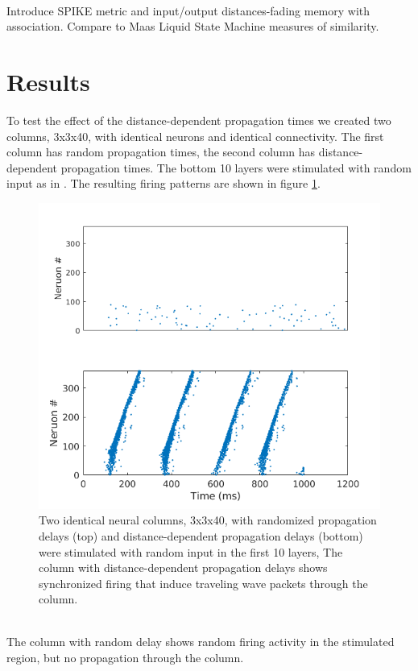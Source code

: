 \documentclass[a4paper,11pt]{article}
\begin{document}
\\
Introduce SPIKE metric and input/output distances-fading memory with association.
Compare to Maas Liquid State Machine measures of similarity.

\section{Results}
To test the effect of the distance-dependent propagation times we created two columns, 3x3x40,  with identical neurons and identical connectivity.
The first column has random propagation times, the second column has distance-dependent propagation times.
The bottom 10 layers were stimulated with random input as in \cite{izhikevich2003}.
The resulting firing patterns are shown in figure \ref{fig:delaycompare}.
\begin{figure}
 \caption{Two identical neural columns, 3x3x40, with randomized propagation delays (top) and distance-dependent propagation delays (bottom) were stimulated with random input in the first 10 layers,
 The column with distance-dependent propagation delays shows synchronized firing that induce traveling wave packets through the column.}
 \label{fig:delaycompare}
 \centering
   \includegraphics[width=\textwidth]{fig/DelayCompare_RandInput}
\end{figure}
\\
The column with random delay shows random firing activity in the stimulated region, but no propagation through the column.
\end{document}
